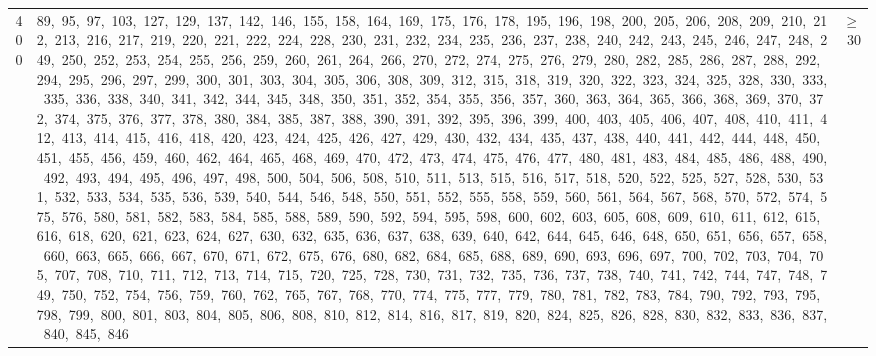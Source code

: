 \begin{longtable}{c|p{}|r}
400 & 89,\ 95,\ 97,\ 103,\ 127,\ 129,\ 137,\ 142,\ 146,\ 155,\ 158,\ 164,\ 169,\ 175,\ 176,\ 178,\ 195,\ 196,\ 198,\ 200,\ 205,\ 206,\ 208,\ 209,\ 210,\ 212,\ 213,\ 216,\ 217,\ 219,\ 220,\ 221,\ 222,\ 224,\ 228,\ 230,\ 231,\ 232,\ 234,\ 235,\ 236,\ 237,\ 238,\ 240,\ 242,\ 243,\ 245,\ 246,\ 247,\ 248,\ 249,\ 250,\ 252,\ 253,\ 254,\ 255,\ 256,\ 259,\ 260,\ 261,\ 264,\ 266,\ 270,\ 272,\ 274,\ 275,\ 276,\ 279,\ 280,\ 282,\ 285,\ 286,\ 287,\ 288,\ 292,\ 294,\ 295,\ 296,\ 297,\ 299,\ 300,\ 301,\ 303,\ 304,\ 305,\ 306,\ 308,\ 309,\ 312,\ 315,\ 318,\ 319,\ 320,\ 322,\ 323,\ 324,\ 325,\ 328,\ 330,\ 333,\ 335,\ 336,\ 338,\ 340,\ 341,\ 342,\ 344,\ 345,\ 348,\ 350,\ 351,\ 352,\ 354,\ 355,\ 356,\ 357,\ 360,\ 363,\ 364,\ 365,\ 366,\ 368,\ 369,\ 370,\ 372,\ 374,\ 375,\ 376,\ 377,\ 378,\ 380,\ 384,\ 385,\ 387,\ 388,\ 390,\ 391,\ 392,\ 395,\ 396,\ 399,\ 400,\ 403,\ 405,\ 406,\ 407,\ 408,\ 410,\ 411,\ 412,\ 413,\ 414,\ 415,\ 416,\ 418,\ 420,\ 423,\ 424,\ 425,\ 426,\ 427,\ 429,\ 430,\ 432,\ 434,\ 435,\ 437,\ 438,\ 440,\ 441,\ 442,\ 444,\ 448,\ 450,\ 451,\ 455,\ 456,\ 459,\ 460,\ 462,\ 464,\ 465,\ 468,\ 469,\ 470,\ 472,\ 473,\ 474,\ 475,\ 476,\ 477,\ 480,\ 481,\ 483,\ 484,\ 485,\ 486,\ 488,\ 490,\ 492,\ 493,\ 494,\ 495,\ 496,\ 497,\ 498,\ 500,\ 504,\ 506,\ 508,\ 510,\ 511,\ 513,\ 515,\ 516,\ 517,\ 518,\ 520,\ 522,\ 525,\ 527,\ 528,\ 530,\ 531,\ 532,\ 533,\ 534,\ 535,\ 536,\ 539,\ 540,\ 544,\ 546,\ 548,\ 550,\ 551,\ 552,\ 555,\ 558,\ 559,\ 560,\ 561,\ 564,\ 567,\ 568,\ 570,\ 572,\ 574,\ 575,\ 576,\ 580,\ 581,\ 582,\ 583,\ 584,\ 585,\ 588,\ 589,\ 590,\ 592,\ 594,\ 595,\ 598,\ 600,\ 602,\ 603,\ 605,\ 608,\ 609,\ 610,\ 611,\ 612,\ 615,\ 616,\ 618,\ 620,\ 621,\ 623,\ 624,\ 627,\ 630,\ 632,\ 635,\ 636,\ 637,\ 638,\ 639,\ 640,\ 642,\ 644,\ 645,\ 646,\ 648,\ 650,\ 651,\ 656,\ 657,\ 658,\ 660,\ 663,\ 665,\ 666,\ 667,\ 670,\ 671,\ 672,\ 675,\ 676,\ 680,\ 682,\ 684,\ 685,\ 688,\ 689,\ 690,\ 693,\ 696,\ 697,\ 700,\ 702,\ 703,\ 704,\ 705,\ 707,\ 708,\ 710,\ 711,\ 712,\ 713,\ 714,\ 715,\ 720,\ 725,\ 728,\ 730,\ 731,\ 732,\ 735,\ 736,\ 737,\ 738,\ 740,\ 741,\ 742,\ 744,\ 747,\ 748,\ 749,\ 750,\ 752,\ 754,\ 756,\ 759,\ 760,\ 762,\ 765,\ 767,\ 768,\ 770,\ 774,\ 775,\ 777,\ 779,\ 780,\ 781,\ 782,\ 783,\ 784,\ 790,\ 792,\ 793,\ 795,\ 798,\ 799,\ 800,\ 801,\ 803,\ 804,\ 805,\ 806,\ 808,\ 810,\ 812,\ 814,\ 816,\ 817,\ 819,\ 820,\ 824,\ 825,\ 826,\ 828,\ 830,\ 832,\ 833,\ 836,\ 837,\ 840,\ 845,\ 846 & $\ge$ 30 \\

\end{longtable}
